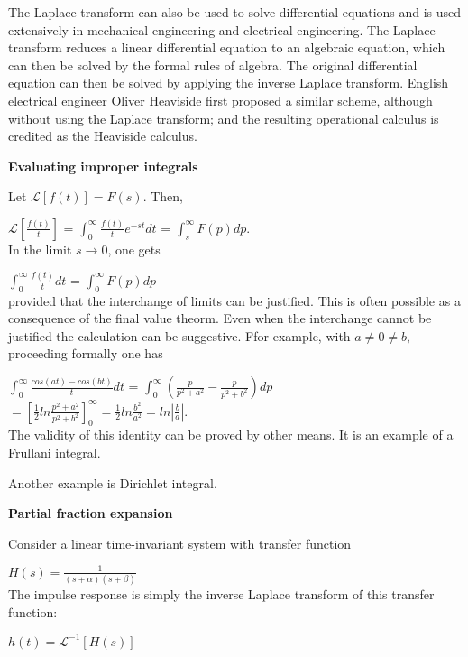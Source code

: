 \documentclass[12pt]{article}
\begin{document}
{The Laplace transform can also be used to solve differential equations and is used extensively in mechanical engineering and electrical engineering. The Laplace transform reduces a linear differential equation to an algebraic equation, which can then be solved by the formal rules of algebra. The original differential equation can then be solved by applying the inverse Laplace transform. English electrical engineer Oliver Heaviside first proposed a similar scheme, although without using the Laplace transform; and the resulting operational calculus is credited as the Heaviside calculus.


\textbf{Evaluating improper integrals}

Let $\mathcal{L}[f(t)] = F(s)$. Then,

$\mathcal{L}[\frac{f(t)}{t}]$ = \(\int_{0}^{\infty} \frac{f(t)}{t} e^{-st}dt\) = \(\int_{s}^{\infty} F(p) dp\).\\

In the limit $s \to 0$, one gets


\(\int_{0}^{\infty} \frac{f(t)}{t}dt\) = \(\int_{0}^{\infty} F(p)dp\)\\

provided that the interchange of limits can be justified. This is often possible as a consequence of the final value theorm. Even when the interchange cannot be justified the calculation can be suggestive. Ffor example, with $a \neq 0 \neq b$, proceeding formally one has

\(\int_{0}^{\infty} \frac{cos(at) - cos(bt)}{t} dt\) = \(\int_{0}^{\infty} (\frac{p}{p^2 + a^2} - \frac{p}{p^2 + b^2}) dp\)\\

$= [\frac{1}{2} ln \frac{p^2 + a^2}{p^2 + b^2}]_{0}^{\infty} = \frac{1}{2} ln \frac{b^2}{a^2} = ln|\frac{b}{a}|$.\\

The validity of this identity can be proved by other means. It is an example of a Frullani integral.

Another example is Dirichlet integral.


\textbf{Partial fraction expansion}

Consider a linear time-invariant system with transfer function


$H(s) = \frac{1}{(s + \alpha)(s + \beta)}$\\

The impulse response is simply the inverse Laplace transform of this transfer function:

$h(t)=\mathcal {L}^{-1}[H(s)]$\\

}
\end{document}
